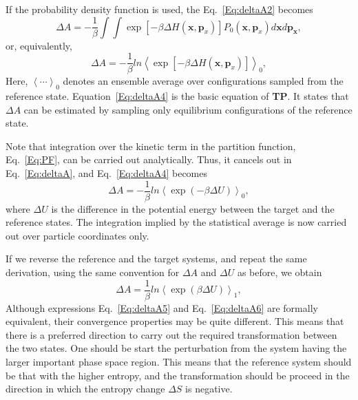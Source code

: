 If the probability density function is used, the Eq.~\ref{Eq:deltaA2}  becomes
\begin{equation}
\Delta A = -\frac{1}{\beta} \int\int \exp[-\beta \Delta H(\textbf{x},\textbf{p}_{x})] P_{0}(\textbf{x},\textbf{p}_{x}) d\textbf{x}d\textbf{p}_\textbf{x},
\label{Eq:deltaA3}
\end{equation}
or, equivalently,
\begin{equation}
\Delta A = -\frac{1}{\beta} ln \left \langle \exp[-\beta \Delta H(\textbf{x},\textbf{p}_{x})] \right \rangle  _{0},
\label{Eq:deltaA4}
\end{equation}
Here, $\left \langle \cdots \right \rangle _{0}$ denotes an ensemble average over configurations sampled from the reference state. Equation~\ref{Eq:deltaA4} is the basic equation of \textbf{TP}. It states that $\Delta A$ can be estimated by sampling only equilibrium configurations of the reference state.

Note that integration over the kinetic term in the partition function, Eq.~\ref{Eq:PF}, can be carried out analytically. Thus, it cancels out in Eq.~\ref{Eq:deltaA}, and Eq.~\ref{Eq:deltaA4} becomes
\begin{equation}
\Delta A = -\frac{1}{\beta} ln \left \langle \exp(-\beta \Delta U) \right \rangle  _{0},
\label{Eq:deltaA5}
\end{equation}
where $\Delta U$ is the difference in the potential energy between the target and the reference states. The integration implied by the statistical average is now carried out over particle coordinates only.

If we reverse the reference and the target systems, and repeat the same derivation, using the same convention for  $\Delta A$ and $\Delta U$ as before, we obtain
\begin{equation}
\Delta A = \frac{1}{\beta} ln \left \langle \exp(\beta \Delta U) \right \rangle  _{1},
\label{Eq:deltaA6}
\end{equation}
Although expressions Eq.~\ref{Eq:deltaA5} and Eq.~\ref{Eq:deltaA6} are formally equivalent, their convergence properties may be quite different. This means that there is a preferred direction to carry out the required transformation between the two states. One should be start the perturbation from the system having the larger important phase space region. This means that the reference system should be that with the higher entropy, and the transformation should be proceed in the direction in which the entropy change $\Delta S$ is negative. 

